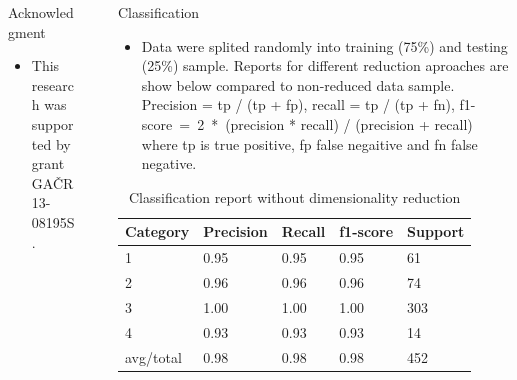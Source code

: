 \documentclass[final,hyperref={pdfpagelabels=false}]{beamer}
\begin{document}
\begin{frame}[t]
\begin{columns}[t]
\begin{column}{.465\textwidth}
\begin{block}{Acknowledgment}

\begin{itemize}
\item This research was supported by grant GAČR 13-08195S.
\end{itemize}

\end{block}



\end{column} %

\begin{column}{.03\textwidth}\end{column} %
 
\begin{column}{.465\textwidth} %


\begin{block}{Classification}
\begin{itemize}
\item Data were splited randomly into training (75\%) and testing (25\%) sample. Reports for different reduction aproaches are show below compared to non-reduced data sample. Precision =  tp / (tp + fp), recall = tp / (tp + fn), f1-score~=~2~*~(precision * recall) / (precision + recall) where tp is true positive, fp false negaitive and fn false negative.
\end{itemize}

\begin{table}
\begin{tabular}{l l l l l}
\toprule
\textbf{Category} & \textbf{Precision} & \textbf{Recall} & \textbf{f1-score} & \textbf{Support}\\
\midrule
1 &      0.95	&  0.95	 &   0.95 &      61 \\ 
2 &      0.96	&  0.96	 &   0.96 &      74 \\ 
3 &      1.00	&  1.00	 &   1.00 &      303\\ 
4 &      0.93	&  0.93	 &   0.93 &      14 \\ 
\midrule
avg/total   & 0.98   &   0.98  &    0.98  &     452 \\
\bottomrule
\end{tabular}
\caption{Classification report without dimensionality reduction}
\end{table}



\end{block}
\end{column}
\end{columns}
\end{frame}
\end{document}
